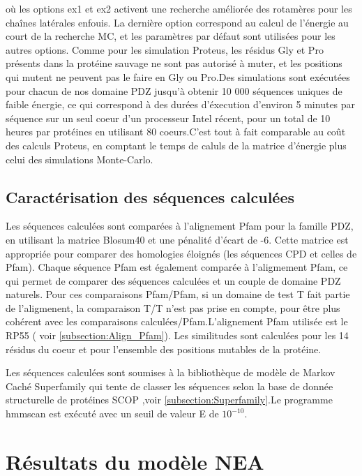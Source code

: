 où les options ex1 et ex2 activent une recherche améliorée des rotamères pour les chaînes latérales enfouis. La dernière option correspond au calcul de l'énergie au court de la recherche MC, et les paramètres par défaut sont utilisées pour les autres options.
Comme pour les simulation Proteus, les résidus Gly et Pro présents dans la protéine sauvage ne sont pas autorisé à muter, et les positions qui mutent ne peuvent pas le faire en Gly  ou Pro.Des simulations sont exécutées pour chacun de nos domaine PDZ jusqu'à obtenir 10 000 séquences uniques de faible énergie, ce qui correspond à des durées d'éxecution d'environ 5 minutes par séquence sur un seul coeur d'un processeur Intel récent, pour un total de 10 heures par protéines en utilisant 80 coeurs.C'est tout à fait comparable au coût des calculs Proteus, en comptant le temps de caluls de la matrice d'énergie plus celui des simulations Monte-Carlo.


\subsection{Caractérisation des séquences calculées}

Les séquences calculées sont comparées à l'alignement Pfam pour la famille PDZ, en utilisant la matrice Blosum40 et une pénalité d'écart de -6. Cette matrice est appropriée pour comparer des homologies éloignés (les séquences CPD et celles de Pfam). Chaque séquence Pfam est également comparée à l'aligmement Pfam, ce qui permet de comparer des séquences calculées et un couple de domaine PDZ naturels. Pour ces comparaisons Pfam/Pfam, si un domaine de test T fait partie de l'aligmenent, la comparaison T/T n'est pas prise en compte, pour être plus cohérent avec les comparaisons calculées/Pfam.L'alignement Pfam utilisée est le \og RP55 \fg ( voir \ref{subsection:Align_Pfam}). Les similitudes sont calculées pour les 14 résidus du coeur et pour l'ensemble des positions mutables de la protéine.

Les séquences calculées sont soumises à la bibliothèque de modèle de Markov Caché Superfamily \cite{Gough01,Wilson07}  qui tente de classer les séquences selon la base de donnée structurelle de protéines SCOP \cite{Andreeva04},voir \ref{subsection:Superfamily}.Le programme hmmscan est exécuté avec un seuil de valeur E de $10^{-10}$. 

\section {Résultats du modèle NEA}
\label{sectionNEA} 
